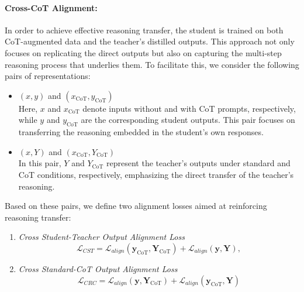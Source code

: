 \paragraph{Cross-CoT Alignment:}
In order to achieve effective reasoning transfer, the student is trained on both CoT-augmented data and the teacher’s distilled outputs. This approach not only focuses on replicating the direct outputs but also on capturing the multi-step reasoning process that underlies them. To facilitate this, we consider the following pairs of representations:

\begin{itemize}[leftmargin=*]
    \item \((x, y)\) and \((x_{\text{CoT}}, y_{\text{CoT}})\) \\
    Here, \(x\) and \(x_{\text{CoT}}\) denote inputs without and with CoT prompts, respectively, while \(y\) and \(y_{\text{CoT}}\) are the corresponding student outputs. This pair focuses on transferring the reasoning embedded in the student's own responses.
    
    \item  \((x, Y)\) and \((x_{\text{CoT}}, Y_{\text{CoT}})\) \\
    In this pair, \(Y\) and \(Y_{\text{CoT}}\) represent the teacher’s outputs under standard and CoT conditions, respectively, emphasizing the direct transfer of the teacher’s reasoning.
\end{itemize}

Based on these pairs, we define two alignment losses aimed at reinforcing reasoning transfer:

\begin{enumerate}
    \item \textit{Cross Student-Teacher Output Alignment Loss}
    \begin{equation}\label{eq:cot_loss2}
        \mathcal{L}_{CST} = \mathcal{L}_{align}(\mathbf{y}_{\text{CoT}}, \mathbf{Y}_{\text{CoT}}) + \mathcal{L}_{align}(\mathbf{y}, \mathbf{Y}),
    \end{equation}
    
    \item \textit{Cross Standard-CoT Output Alignment Loss}
    \begin{equation}\label{eq:cot_loss1}
    \mathcal{L}_{CRC} = \mathcal{L}_{align}(\mathbf{y}, \mathbf{Y}_{\text{CoT}}) + \mathcal{L}_{align}(\mathbf{y}_{\text{CoT}}, \mathbf{Y})
\end{equation}
\end{enumerate}

